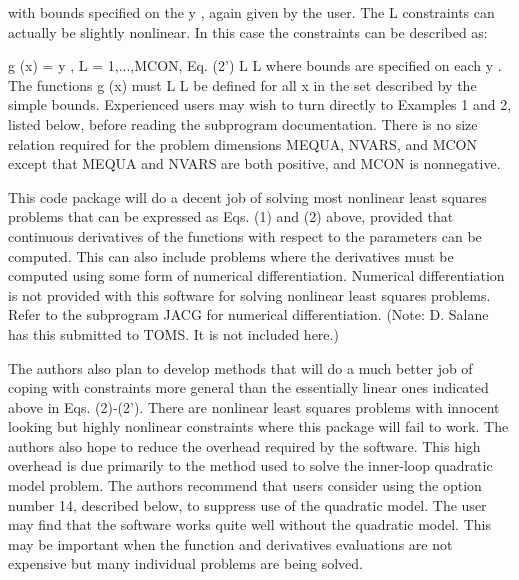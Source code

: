 \documentclass[11pt,twoside,nolof]{starlink}
\begin{document}
\begin{terminalv}
  with  bounds  specified on the y , again given by the user.  The
                                  L
  constraints  can  actually  be slightly nonlinear.  In this case
  the constraints can be described as:

       g (x) =  y , L = 1,...,MCON,                Eq. (2')
        L        L
  where bounds are specified on each y .  The functions g (x) must
                                      L                  L
  be  defined for all x in the set described by the simple bounds.
  Experienced users may wish to turn directly to Examples 1 and 2,
  listed  below,  before  reading  the  subprogram  documentation.
  There  is  no  size relation required for the problem dimensions
  MEQUA,  NVARS,  and  MCON  except  that MEQUA and NVARS are both
  positive,  and   MCON is nonnegative.

  This code package will do a decent job of solving most nonlinear
  least squares problems that can be expressed as Eqs. (1) and (2)
  above,  provided  that  continuous  derivatives of the functions
  with  respect  to the parameters can be computed.  This can also
  include  problems  where  the derivatives must be computed using
  some    form    of    numerical    differentiation.    Numerical
  differentiation is not provided with this software for solving
  nonlinear  least squares problems.  Refer to the subprogram
  JACG for numerical differentiation.  (Note: D. Salane has this
  submitted to TOMS.  It is not included here.)

  The  authors  also  plan  to develop methods that will do a much
  better  job  of  coping  with  constraints more general than the
  essentially linear ones indicated above in Eqs. (2)-(2').  There
  are  nonlinear  least squares problems with innocent looking but
  highly  nonlinear  constraints  where  this package will fail to
  work.   The authors also hope to reduce the overhead required by
  the software.  This high overhead is due primarily to the method
  used  to  solve  the  inner-loop  quadratic  model problem.  The
  authors  recommend  that  users consider using the option number
  14, described below, to suppress use of the quadratic model. The
  user  may  find  that  the software works quite well without the
  quadratic  model.  This  may  be important when the function and
  derivatives  evaluations  are  not expensive but many individual
  problems are being solved.


\end{terminalv}
\end{document}
